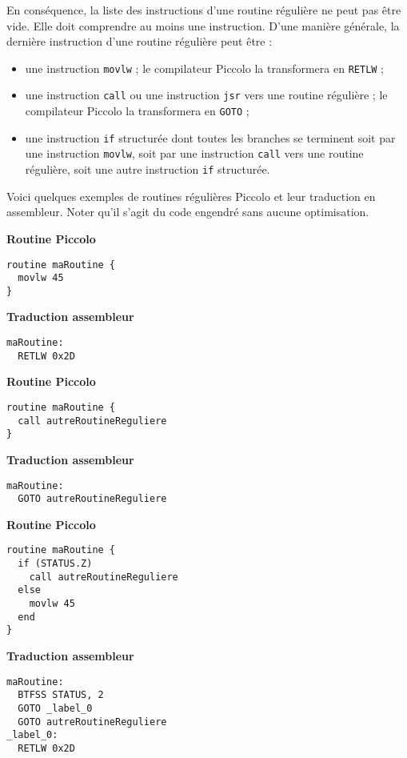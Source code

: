 En conséquence, la liste des instructions d'une routine régulière ne peut pas être vide. Elle doit comprendre au moins une instruction. D'une manière générale, la dernière instruction d'une routine régulière peut être :
\begin{itemize}
  \item une instruction \texttt{movlw} ; le compilateur Piccolo la transformera en \texttt{RETLW} ;
  \item une instruction \texttt{call} ou une instruction \texttt{jsr} vers une routine régulière ; le compilateur Piccolo la transformera en \texttt{GOTO} ;
  \item une instruction \texttt{if} structurée dont toutes les branches se terminent soit par une instruction \texttt{movlw}, soit par une instruction \texttt{call} vers une routine régulière, soit une autre instruction \texttt{if} structurée.
\end{itemize}

Voici quelques exemples de routines régulières Piccolo et leur traduction en assembleur. Noter qu'il s'agit du code engendré sans aucune optimisation.
\begin{multicols}{2}
\textbf{Routine Piccolo}
\begin{lstlisting}[language=piccolo]
routine maRoutine {
  movlw 45
}
\end{lstlisting}
\columnbreak
\textbf{Traduction assembleur}
\begin{lstlisting}[language=assembleur]
maRoutine:
  RETLW 0x2D
\end{lstlisting}
\end{multicols}

\begin{multicols}{2}
\textbf{Routine Piccolo}
\begin{lstlisting}[language=piccolo]
routine maRoutine {
  call autreRoutineReguliere
}
\end{lstlisting}
\columnbreak
\textbf{Traduction assembleur}
\begin{lstlisting}[language=assembleur]
maRoutine:
  GOTO autreRoutineReguliere
\end{lstlisting}
\end{multicols}


\begin{multicols}{2}
\textbf{Routine Piccolo}
\begin{lstlisting}[language=piccolo]
routine maRoutine {
  if (STATUS.Z)
    call autreRoutineReguliere
  else
    movlw 45
  end
}
\end{lstlisting}
\columnbreak
\textbf{Traduction assembleur}
\begin{lstlisting}[language=assembleur]
maRoutine:
  BTFSS STATUS, 2
  GOTO _label_0
  GOTO autreRoutineReguliere
_label_0:
  RETLW 0x2D
\end{lstlisting}
\end{multicols}



